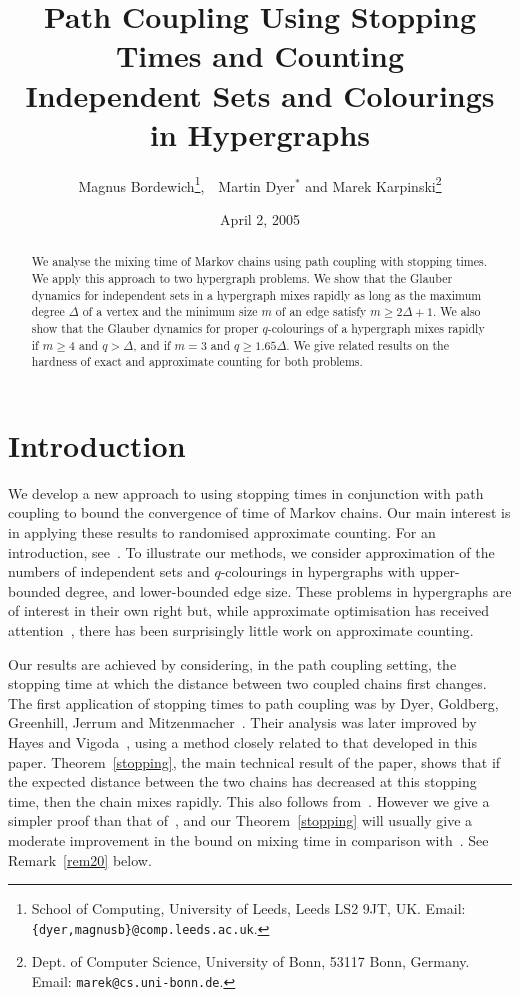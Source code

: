 \documentclass[11pt]{article}
\title{Path Coupling Using Stopping Times and Counting\\Independent Sets
and Colourings in Hypergraphs}
\author{Magnus Bordewich\thanks{School of
Computing, University of Leeds, Leeds LS2 9JT, UK. Email:
\texttt{\{dyer,magnusb\}@comp.leeds.ac.uk}.},\ \, Martin Dyer${}^*$ and Marek
Karpinski\thanks{Dept. of Computer Science, University of Bonn, 53117 Bonn,
Germany. Email: \texttt{marek@cs.uni-bonn.de}.}}
\date{April 2, 2005}
\theoremstyle{definition}
\theoremstyle{remark}
\begin{document}
\maketitle

\begin{abstract}
We analyse the mixing time of Markov chains using
path coupling with stopping times. We apply this approach to two hypergraph
problems. We show that the Glauber dynamics for independent sets in a
hypergraph mixes rapidly as long as the maximum degree $\Delta$ of a vertex
and the minimum size $m$ of an edge satisfy $m\geq 2\Delta+1$. We also show
that the Glauber dynamics for proper $q$-colourings of a hypergraph mixes
rapidly if $m\geq 4$ and $q > \Delta$, and if $m=3$ and $q\geq1.65\Delta$.
We give related results on the hardness of exact and approximate counting
for both problems.
\end{abstract}

\section{Introduction}

We develop a  new approach to using stopping times in conjunction with path
coupling to bound the convergence of time of Markov chains. Our main
interest is in applying these results to randomised approximate counting.
For an introduction, see~\cite{J03}. To illustrate our methods, we consider
approximation of the numbers of independent sets and $q$-colourings in
hypergraphs with upper-bounded degree, and lower-bounded edge size. These
problems in hypergraphs are of interest in their own right but, while
approximate optimisation has received
attention~\cite{DRS02,DGKR03,HL98,KNS01}, there has been surprisingly
little work on approximate counting.

Our results are achieved by considering, in the path coupling setting, the
stopping time at which the distance between two coupled chains first
changes.  The first application of stopping times to path coupling was by
Dyer, Goldberg, Greenhill, Jerrum and Mitzenmacher~\cite{DGGJM01}. Their
analysis was later improved by Hayes and Vigoda~\cite{HV04}, using a method
closely related to that developed in this paper. Theorem~\ref{stopping},
the main technical result of the paper, shows that if the expected distance
between the two chains has decreased at this stopping time, then the chain
mixes rapidly. This also follows from~\cite[Corollary~4]{HV04}.  However we
give a simpler proof than that of~\cite{HV04}, and our
Theorem~\ref{stopping} will usually give a moderate improvement in the
bound on mixing time in comparison with~\cite[Corollary~4]{HV04}. See
Remark~\ref{rem20} below.
\end{document}
